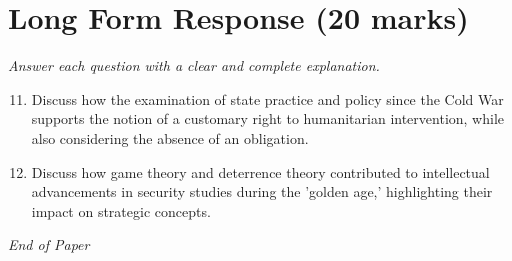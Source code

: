 \documentclass[12pt]{article}
\begin{document}
\section*{Long Form Response (20 marks)}
\textit{Answer each question with a clear and complete explanation.}
\begin{enumerate}[label=\arabic*.]
\setcounter{enumi}{10}
\item Discuss how the examination of state practice and policy since the Cold War supports the notion of a customary right to humanitarian intervention, while also considering the absence of an obligation.
\item Discuss how game theory and deterrence theory contributed to intellectual advancements in security studies during the 'golden age,' highlighting their impact on strategic concepts.
\end{enumerate}

\vfill
\noindent\textit{End of Paper}
\end{document}
